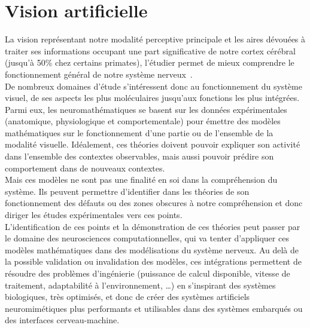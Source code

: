 
\section{Vision artificielle}
La vision représentant notre modalité perceptive principale et les aires dévouées à traiter ses informations occupant une part significative de notre cortex cérébral (jusqu'à 50\% chez certains primates), l'étudier permet de mieux comprendre le fonctionnement général de notre système nerveux~\autocite{Zhaoping2014}.\\
De nombreux domaines d'étude s'intéressent donc au fonctionnement du système visuel, de ses aspects les plus moléculaires jusqu'aux fonctions les plus intégrées. Parmi eux, les neuromathématiques se basent sur les données expérimentales (anatomique, physiologique et comportementale) pour émettre des modèles mathématiques sur le fonctionnement d'une partie ou de l'ensemble de la modalité visuelle. Idéalement, ces théories doivent pouvoir expliquer son activité dans l'ensemble des contextes observables, mais aussi pouvoir prédire son comportement dans de nouveaux contextes\autocite{Zhaoping2014}.\\
Mais ces modèles ne sont pas une finalité en soi dans la compréhension du système. Ils peuvent permettre d'identifier dans les théories de son fonctionnement des défauts ou des zones obscures à notre compréhension et donc diriger les études expérimentales vers ces points. \autocite{Zhaoping2014} \\
L'identification de ces points et la démonstration de ces théories peut passer par le domaine des neurosciences computationnelles, qui va tenter d'appliquer ces modèles mathématiques dans des modélisations du système nerveux. Au delà de la possible validation ou invalidation des modèles, ces intégrations permettent de résoudre des problèmes d'ingénierie (puissance de calcul disponible, vitesse de traitement, adaptabilité à l'environnement, \ldots) en s'inspirant des systèmes biologiques, très optimisés, et donc de créer des systèmes artificiels neuromimétiques plus performants et utilisables dans des systèmes embarqués ou des interfaces cerveau-machine. \autocite{Potthast2016} \\

